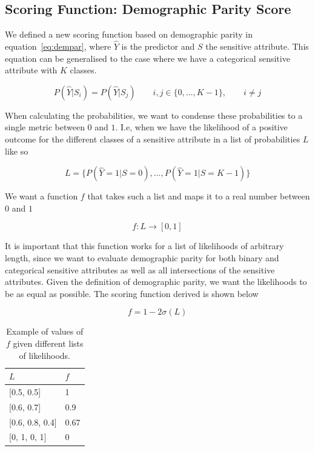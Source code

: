 \subsection{Scoring Function: Demographic Parity Score}
\label{sec:demparscore}
We defined a new scoring function based on demographic parity in equation~\ref{eq:dempar}, where $\hat{Y}$ is the predictor and $S$ the sensitive attribute. This equation can be generalised to the case where we have a categorical sensitive attribute with $K$ classes.

$$
P(\hat{Y} | S_i) = P(\hat{Y} | S_j) \qquad i, j \in \{0, \dots, K-1\}, \qquad i \neq j
$$

When calculating the probabilities, we want to condense these probabilities to a single metric between $0$ and $1$. I.e, when we have the likelihood of a positive outcome for the different classes of a sensitive attribute in a list of  probabilities $L$ like so

$$
L =\{ P(\hat{Y}=1 | S=0), \dots, P(\hat{Y}=1 | S=K-1) \}
$$

We want a function $f$ that takes such a list and maps it to a real number between $0$ and $1$

$$
f: L \rightarrow [0, 1]
$$

It is important that this function works for a list of likelihoods of arbitrary length, since we want to evaluate demographic parity for both binary and categorical sensitive attributes as well as all intersections of the sensitive attributes. Given the definition of demographic parity, we want the likelihoods to be as equal as possible. The scoring function derived is shown below

$$
f = 1 - 2\sigma(L)
$$

\begin{table}[]
    \centering
    \begin{tabular}{|l|l|}
        \hline
        $L$                 & $f$  \\ \hline
        {[}0.5, 0.5{]}      & 1    \\ \hline
        {[}0.6, 0.7{]}      & 0.9  \\ \hline
        {[}0.6, 0.8, 0.4{]} & 0.67 \\ \hline
        {[}0, 1, 0, 1{]}    & 0    \\ \hline
    \end{tabular}
    \caption{Example of values of $f$ given different lists of likelihoods.}
    \label{tab:scorefunc}
\end{table}

